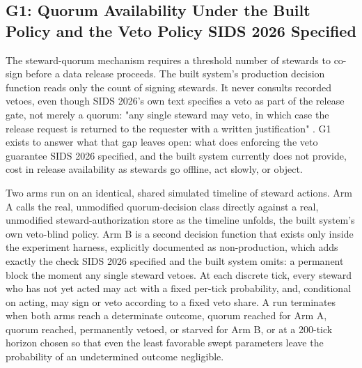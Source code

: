\subsection{G1: Quorum Availability Under the Built Policy and the Veto Policy SIDS 2026 Specified}

The steward-quorum mechanism requires a threshold number of stewards to co-sign before a data release proceeds. The built system's production decision function reads only the count of signing stewards. It never consults recorded vetoes, even though SIDS 2026's own text specifies a veto as part of the release gate, not merely a quorum: "any single steward may veto, in which case the release request is returned to the requester with a written justification" \cite{katrakazas2026}. G1 exists to answer what that gap leaves open: what does enforcing the veto guarantee SIDS 2026 specified, and the built system currently does not provide, cost in release availability as stewards go offline, act slowly, or object.

Two arms run on an identical, shared simulated timeline of steward actions. Arm A calls the real, unmodified quorum-decision class directly against a real, unmodified steward-authorization store as the timeline unfolds, the built system's own veto-blind policy. Arm B is a second decision function that exists only inside the experiment harness, explicitly documented as non-production, which adds exactly the check SIDS 2026 specified and the built system omits: a permanent block the moment any single steward vetoes. At each discrete tick, every steward who has not yet acted may act with a fixed per-tick probability, and, conditional on acting, may sign or veto according to a fixed veto share. A run terminates when both arms reach a determinate outcome, quorum reached for Arm A, quorum reached, permanently vetoed, or starved for Arm B, or at a 200-tick horizon chosen so that even the least favorable swept parameters leave the probability of an undetermined outcome negligible.

